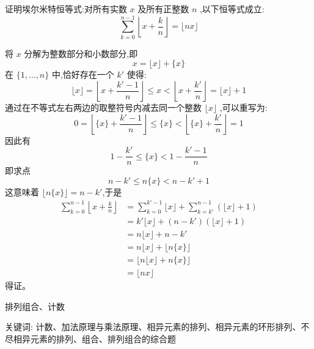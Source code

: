 \begin{questions}
    \question 证明埃尔米特恒等式:对所有实数 $x$ 及所有正整数 $n$ ,以下恒等式成立:
    \[ 
    \sum_{k=0}^{n-1} \left\lfloor x + \frac{k}{n} \right\rfloor = \lfloor nx \rfloor 
    \]
    \begin{solution}
        将 $x$ 分解为整数部分和小数部分,即 
        \[
        x = \lfloor x \rfloor + \{x\}
        \]
        在 $\{1, \dots, n\}$ 中,恰好存在一个 $k'$ 使得:
        \[ 
        \lfloor x \rfloor = \left\lfloor x + \frac{k'-1}{n} \right\rfloor \le x < \left\lfloor x + \frac{k'}{n} \right\rfloor = \lfloor x \rfloor + 1 
        \]
        通过在不等式左右两边的取整符号内减去同一个整数 $\lfloor x \rfloor$ ,可以重写为:
        \[ 
        0 = \left\lfloor \{x\} + \frac{k'-1}{n} \right\rfloor \le \{x\} < \left\lfloor \{x\} + \frac{k'}{n} \right\rfloor = 1  
        \]
        因此有
        \[ 
        1 - \frac{k'}{n} \le \{x\} < 1 - \frac{k'-1}{n}  
        \]
        即求点
        \[ 
        n - k' \le n\{x\} < n - k' + 1 
        \]
        这意味着 $\lfloor n\{x\} \rfloor = n - k'$,于是
        \begin{align}
        \sum_{k=0}^{n-1} \left\lfloor x + \frac{k}{n} \right\rfloor &= \sum_{k=0}^{k'-1} \lfloor x \rfloor + \sum_{k=k'}^{n-1} (\lfloor x \rfloor + 1) \\
        &= k' \lfloor x \rfloor + (n - k')(\lfloor x \rfloor + 1) \\
        &= n \lfloor x \rfloor + n - k' \\
        &= n \lfloor x \rfloor + \lfloor n\{x\} \rfloor \\
        &= \lfloor n \lfloor x \rfloor + n\{x\} \rfloor \\
        &= \lfloor nx \rfloor
        \end{align}
        得证。
    \end{solution}
\end{questions}
\pagebreak

\begin{center}
  {\fontsize{30pt}{26pt}\selectfont
    \hypertarget{排列组合、计数}{排列组合、计数} \label{排列组合、计数}
  }
\end{center}
\separator
\begin{center}
    关键词: 计数、加法原理与乘法原理、相异元素的排列、相异元素的环形排列、不尽相异元素的排列、组合、排列组合的综合题
\end{center}
\vspace{0.5pt}

